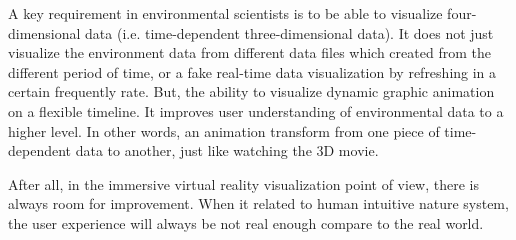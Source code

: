 A key requirement in environmental scientists is to be able to visualize four-dimensional data (i.e. time-dependent three-dimensional data). It does not just visualize the environment data from different data files which created from the different period of time, or a fake real-time data visualization by refreshing in a certain frequently rate. But, the ability to visualize dynamic graphic animation on a flexible timeline. It improves user understanding of environmental data to a higher level. In other words, an animation transform from one piece of time-dependent data to another, just like watching the 3D movie.

After all, in the immersive virtual reality visualization point of view, there is always room for improvement. When it related to human intuitive nature system, the user experience will always be not real enough compare to the real world.

